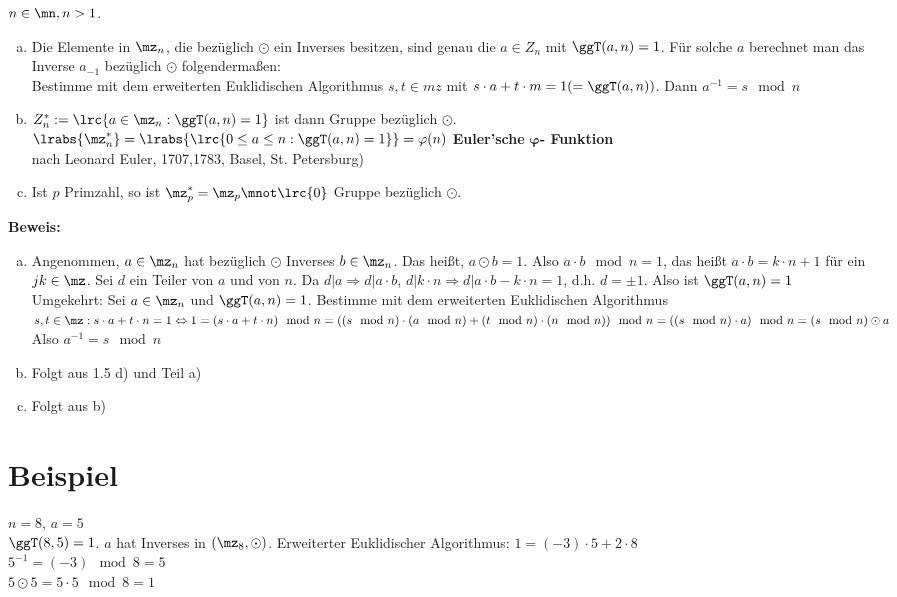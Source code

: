 	$n\in\mn,n>1$.
	\begin{enumerate}[a)]
		\item Die Elemente in $\mz_n$, die bezüglich $\odot$ ein Inverses besitzen, sind genau die $a\in Z_n$ mit $\ggT(a,n)=1$. Für solche $a$ berechnet man das Inverse $a_{-1}$ bezüglich $\odot$ folgendermaßen:\\
		Bestimme mit dem erweiterten Euklidischen Algorithmus $s,t\in mz$ mit $s\cdot a+t\cdot m=1(=\ggT(a,n))$. Dann $a^{-1}=s\mod n$

		\item $Z_n^*:=\lrc{a\in\mz_n:\ggT(a,n)=1}$ ist dann Gruppe bezüglich $\odot$.\\
		$\lrabs{\mz_n^*}=\lrabs{\lrc{0\leq a\leq n:\ggT(a,n)=1}}=\varphi(n)$ \textbf{Euler'sche} $\mathbf{\varphi}$\textbf{- Funktion}\\ nach Leonard Euler, 1707,1783, Basel, St. Petersburg)

		\item Ist $p$ Primzahl, so ist $\mz_p^*=\mz_p\mnot\lrc{0}$ Gruppe bezüglich $\odot$.
	\end{enumerate}

	\textbf{Beweis:}
	\begin{enumerate}[a)]
		\item Angenommen, $a\in\mz_n$ hat bezüglich $\odot$ Inverses $b\in\mz_n$. Das heißt, $a\odot b=1$. Also $a\cdot b\mod n=1$, das heißt $a\cdot b=k\cdot n+1$ für ein $jk\in\mz$. Sei $d$ ein Teiler von $a$ und von $n$. Da $d|a\Rightarrow d|a\cdot b$, $d|k\cdot n\Rightarrow d|a\cdot b-k\cdot n=1$, d.h. $d=\pm 1$. Also ist $\ggT(a,n)=1$\\
		Umgekehrt: Sei $a\in\mz_n$ und $\ggT(a,n)=1$. Bestimme mit dem erweiterten Euklidischen Algorithmus $s,t\in\mz:s\cdot a+t\cdot n=1\Leftrightarrow 1=(s\cdot a+t\cdot n)\mod n=((s\mod n)\cdot(a\mod n)+(t\mod n)\cdot(n\mod n))\mod n=((s\mod n)\cdot a)\mod n=(s\mod n)\odot a$\\
		Also $a^{-1}=s\mod n$

		\item Folgt aus 1.5 d) und Teil a)
		\item Folgt aus b)
	\end{enumerate}

	\section{Beispiel}

	$n=8$, $a=5$\\
	$\ggT(8,5)=1$. $a$ hat Inverses in $(\mz_8,\odot)$.
	Erweiterter Euklidischer Algorithmus: $1=(-3)\cdot 5+2\cdot 8$\\
	$5^{-1}=(-3)\mod 8=5$\\
	$5\odot 5=5\cdot 5\mod 8=1$

